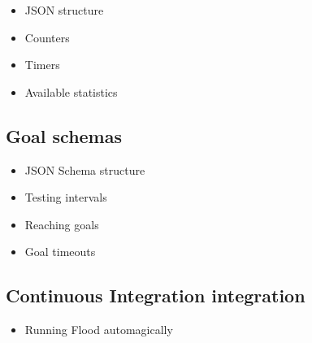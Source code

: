 \documentclass[a4paper]{article}
\begin{document}
\begin{itemize}
\item JSON structure
\item Counters
\item Timers
\item Available statistics
\end{itemize}
\subsection{Goal schemas}
\label{sec-4-2}


\begin{itemize}
\item JSON Schema structure
\item Testing intervals
\item Reaching goals
\item Goal timeouts
\end{itemize}
\subsection{Continuous Integration integration}
\label{sec-4-3}


\begin{itemize}
\item Running Flood automagically
\end{itemize}
\end{document}

